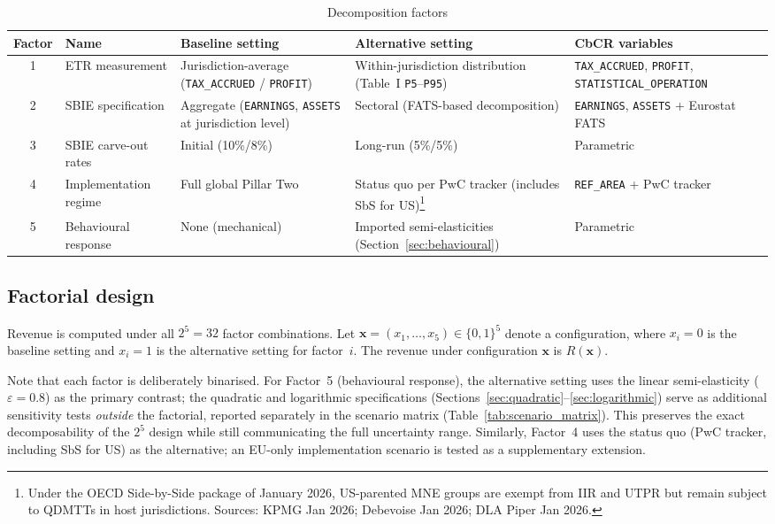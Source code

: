 \documentclass[11pt,a4paper]{article}
\newcommand{\code}[1]{\texttt{#1}}
\begin{document}
\begin{table}[H]
\centering
\caption{Decomposition factors}
\label{tab:factors}
\small
\begin{tabular}{@{}clp{3.5cm}p{3.5cm}p{3cm}@{}}
\toprule
Factor & Name & Baseline setting & Alternative setting & CbCR variables \\
\midrule
1 & ETR measurement & Jurisdiction-average (\code{TAX\_ACCRUED} / \code{PROFIT}) & Within-jurisdiction distribution (Table~I \code{P5}--\code{P95}) & \code{TAX\_ACCRUED}, \code{PROFIT}, \code{STATISTICAL\_OPERATION} \\
2 & SBIE specification & Aggregate (\code{EARNINGS}, \code{ASSETS} at jurisdiction level) & Sectoral (FATS-based decomposition) & \code{EARNINGS}, \code{ASSETS} + Eurostat FATS \\
3 & SBIE carve-out rates & Initial (10\%/8\%) & Long-run (5\%/5\%) & Parametric \\
4 & Implementation regime & Full global Pillar Two & Status quo per PwC tracker (includes SbS for US)\footnote{Under the OECD Side-by-Side package of January 2026, US-parented MNE groups are exempt from IIR and UTPR but remain subject to QDMTTs in host jurisdictions. Sources: KPMG Jan 2026; Debevoise Jan 2026; DLA Piper Jan 2026.} & \code{REF\_AREA} + PwC tracker \\
5 & Behavioural response & None (mechanical) & Imported semi-elasticities (Section~\ref{sec:behavioural}) & Parametric \\
\bottomrule
\end{tabular}
\end{table}

\subsection{Factorial design}\label{sec:factorial}

Revenue is computed under all $2^5 = 32$ factor combinations. Let $\mathbf{x} = (x_1, \ldots, x_5) \in \{0, 1\}^5$ denote a configuration, where $x_i = 0$ is the baseline setting and $x_i = 1$ is the alternative setting for factor~$i$. The revenue under configuration $\mathbf{x}$ is $R(\mathbf{x})$.

Note that each factor is deliberately binarised. For Factor~5 (behavioural response), the alternative setting uses the linear semi-elasticity ($\varepsilon = 0.8$) as the primary contrast; the quadratic and logarithmic specifications (Sections~\ref{sec:quadratic}--\ref{sec:logarithmic}) serve as additional sensitivity tests \emph{outside} the factorial, reported separately in the scenario matrix (Table~\ref{tab:scenario_matrix}). This preserves the exact decomposability of the $2^5$ design while still communicating the full uncertainty range. Similarly, Factor~4 uses the status quo (PwC tracker, including SbS for US) as the alternative; an EU-only implementation scenario is tested as a supplementary extension.
\end{document}
